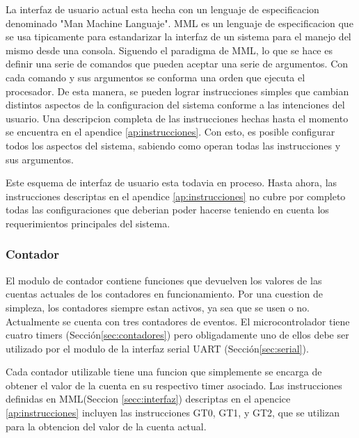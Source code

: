 \documentclass{article}
\theoremstyle{definition}
\theoremstyle{remark}
\begin{document}
La interfaz de usuario actual esta hecha con un lenguaje de especificacion denominado "Man Machine Languaje". MML es un lenguaje de especificacion que se usa tipicamente para estandarizar la interfaz de un sistema para el manejo del mismo desde una consola. Siguendo el paradigma de MML, lo que se hace es definir una serie de comandos que pueden aceptar una serie de argumentos. Con cada comando y sus argumentos se conforma una orden que ejecuta el procesador. De esta manera, se pueden lograr instrucciones simples que cambian distintos aspectos de la configuracion del sistema conforme a las intenciones del usuario. Una descripcion completa de las instrucciones hechas hasta el momento se encuentra en el apendice \ref{ap:instrucciones}. Con esto, es posible configurar todos los aspectos del sistema, sabiendo como operan todas las instrucciones y sus argumentos.

Este esquema de interfaz de usuario esta todavia en proceso. Hasta ahora, las instrucciones descriptas en el apendice \ref{ap:instrucciones} no cubre por completo todas las configuraciones que deberian poder hacerse teniendo en cuenta los requerimientos principales del sistema.


\subsubsection{Contador}
El modulo de contador contiene funciones que devuelven los valores de las cuentas actuales de los contadores en funcionamiento. Por una cuestion de simpleza, los contadores siempre estan activos, ya sea que se usen o no. Actualmente se cuenta con tres contadores de eventos. El microcontrolador tiene cuatro timers (Sección\ref{sec:contadores}) pero obligadamente uno de ellos debe ser utilizado por el modulo de la interfaz serial UART (Sección\ref{sec:serial}).

Cada contador utilizable tiene una funcion que simplemente se encarga de obtener el valor de la cuenta en su respectivo timer asociado. Las instrucciones definidas en MML(Seccion \ref{secc:interfaz}) descriptas en el apencice \ref{ap:instrucciones} incluyen las instrucciones GT0, GT1, y GT2, que se utilizan para la obtencion del valor de la cuenta actual.
\end{document}
